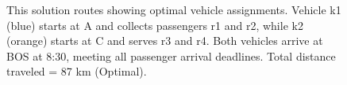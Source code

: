 \begin{figure}[ht!]
\begin{tikzpicture}
    \end{tikzpicture}
    \caption{This solution routes showing optimal vehicle assignments. Vehicle k1 (blue) starts at A and collects passengers r1 and r2, while k2 (orange) starts at C and serves r3 and r4. Both vehicles arrive at BOS at 8:30, meeting all passenger arrival deadlines. Total distance traveled = 87 km ({\color{red}Optimal}).}
    \label{fig:ALASmonte-carlo}
\end{figure}